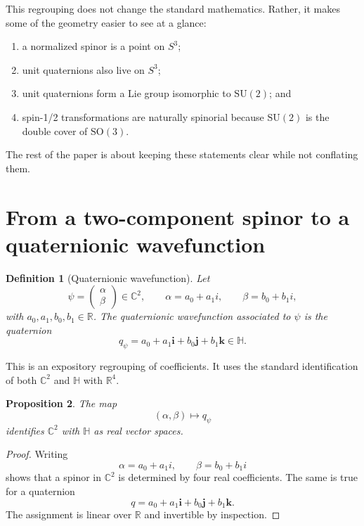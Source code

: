 \documentclass[11pt]{article}
\newtheorem{definition}{Definition}[section]
\newtheorem{proposition}[definition]{Proposition}
\theoremstyle{remark}
\newcommand{\R}{\mathbb{R}}
\newcommand{\C}{\mathbb{C}}
\newcommand{\HH}{\mathbb{H}}
\newcommand{\SU}{\mathrm{SU}}
\newcommand{\SO}{\mathrm{SO}}
\newcommand{\ii}{\mathbf{i}}
\newcommand{\jj}{\mathbf{j}}
\newcommand{\kk}{\mathbf{k}}
\begin{document}
This regrouping does not change the standard mathematics. Rather, it makes some of the geometry easier to see at a glance:
\begin{enumerate}
\item a normalized spinor is a point on $S^3$;
\item unit quaternions also live on $S^3$;
\item unit quaternions form a Lie group isomorphic to $\SU(2)$; and
\item spin-1/2 transformations are naturally spinorial because $\SU(2)$ is the double cover of $\SO(3)$.
\end{enumerate}

The rest of the paper is about keeping these statements clear while not conflating them.

\section{From a two-component spinor to a quaternionic wavefunction}

\begin{definition}[Quaternionic wavefunction]
Let
\[
\psi = \begin{pmatrix} \alpha \\ \beta \end{pmatrix} \in \C^2,
\qquad
\alpha = a_0 + a_1 i,
\qquad
\beta = b_0 + b_1 i,
\]
with $a_0,a_1,b_0,b_1\in\R$. The \emph{quaternionic wavefunction} associated to $\psi$ is the quaternion
\begin{equation}
q_\psi = a_0 + a_1\ii + b_0\jj + b_1\kk \in \HH.
\label{eq:qpsi}
\end{equation}
\end{definition}

This is an expository regrouping of coefficients. It uses the standard identification of both $\C^2$ and $\HH$ with $\R^4$.

\begin{proposition}
The map
\[
(\alpha,\beta) \longmapsto q_\psi
\]
identifies $\C^2$ with $\HH$ as real vector spaces.
\end{proposition}

\begin{proof}
Writing
\[
\alpha = a_0 + a_1 i,
\qquad
\beta = b_0 + b_1 i
\]
shows that a spinor in $\C^2$ is determined by four real coefficients. The same is true for a quaternion
\[
q = a_0 + a_1\ii + b_0\jj + b_1\kk.
\]
The assignment is linear over $\R$ and invertible by inspection.
\end{proof}
\end{document}
